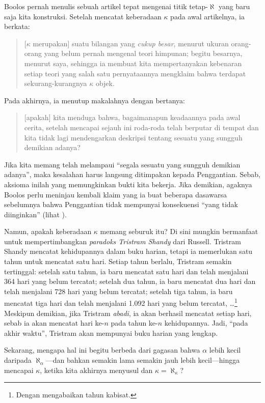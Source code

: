 \documentclass[../../../include/open-logic-section]{subfiles}
\begin{document}
Boolos pernah menulis sebuah artikel tepat mengenai titik tetap-$\aleph$ yang
baru saja kita konstruksi. Setelah mencatat keberadaan $\kappa$ pada awal
artikelnya, ia berkata:
\begin{quote}
	[$\kappa$ merupakan] suatu bilangan yang \emph{cukup besar}, menurut
	ukuran orang-orang yang belum pernah mengenal teori himpunan; begitu
	besarnya, menurut saya, sehingga ia membuat kita mempertanyakan kebenaran
	setiap teori yang salah satu pernyataannya mengklaim bahwa terdapat
	sekurang-kurangnya $\kappa$ objek.
	\citep[hlm.~257]{Boolos2000}
\end{quote}
Pada akhirnya, ia menutup makalahnya dengan bertanya:
\begin{quote}
	[apakah] kita menduga bahwa, bagaimanapun keadaannya pada awal cerita,
	setelah mencapai sejauh ini roda-roda telah berputar di tempat dan kita
	tidak lagi mendengarkan deskripsi tentang sesuatu yang sungguh demikian
	adanya?
	\citep[hlm.~268]{Boolos2000}
\end{quote}
Jika kita memang telah melampaui ``segala sesuatu yang sungguh demikian
adanya'', maka kesalahan harus langsung ditimpakan kepada Penggantian. Sebab,
aksioma inilah yang memungkinkan bukti kita bekerja. Jika demikian, agaknya
Boolos perlu meninjau kembali klaim yang ia buat beberapa dasawarsa
sebelumnya bahwa Penggantian tidak mempunyai konsekuensi ``yang tidak
diinginkan'' (lihat ).

Namun, apakah keberadaan $\kappa$ memang seburuk itu? Di sini mungkin
bermanfaat untuk mempertimbangkan \emph{paradoks Tristram Shandy} dari
Russell. Tristram Shandy mencatat kehidupannya dalam buku harian, tetapi ia
memerlukan satu tahun untuk mencatat satu hari. Setiap tahun berlalu,
Tristram semakin tertinggal: setelah satu tahun, ia baru mencatat satu hari
dan telah menjalani 364 hari yang belum tercatat; setelah dua tahun, ia baru
mencatat dua hari dan telah menjalani 728 hari yang belum tercatat; setelah
tiga tahun, ia baru mencatat tiga hari dan telah menjalani 1.092 hari yang
belum tercatat, \dots\footnote{Dengan mengabaikan tahun kabisat.} Meskipun
demikian, jika Tristram \emph{abadi}, ia akan berhasil mencatat setiap hari,
sebab ia akan mencatat hari ke-$n$ pada tahun ke-$n$ kehidupannya. Jadi,
``pada akhir waktu'', Tristram akan mempunyai buku harian yang lengkap.

Sekarang, mengapa hal ini begitu berbeda dari gagasan bahwa $\alpha$ lebih
kecil daripada $\aleph_\alpha$---dan bahkan semakin lama semakin jauh lebih
kecil---hingga mencapai $\kappa$, ketika kita akhirnya menyusul dan
$\kappa=\aleph_\kappa$?
\end{document}
